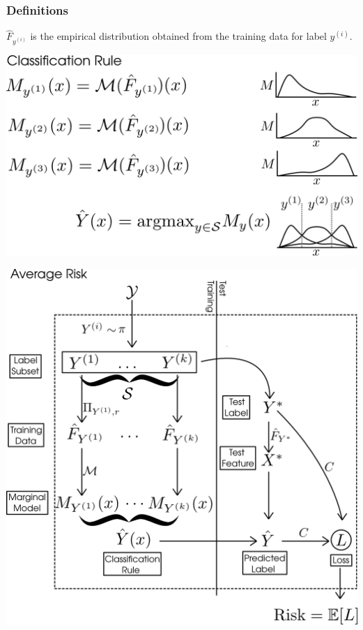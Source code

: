 \documentclass{beamer}
\begin{document}
\begin{frame}
\frametitle{Definitions}

$\hat{F}_{y^{(i)}}$ is the empirical distribution obtained from the training data for label $y^{(i)}$.

\begin{center}
\includegraphics[scale = 0.2]{../info_theory_paper/extrapolation_figures/classification_rule.png}
\end{center}
\end{frame}

\begin{frame}

\begin{center}
\includegraphics[scale = 0.2]{../info_theory_paper/extrapolation_figures/average_risk.png}
\end{center}
\end{frame}
\end{document}
